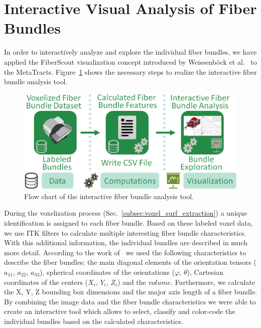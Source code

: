 \section{Interactive Visual Analysis of Fiber Bundles}
\label{subsec:interactive_tool_gui}
In order to interactively analyze and explore the individual fiber bundles, we have applied the FiberScout visualization concept introduced by Weissenb{\"o}ck et al.~\cite{Weissenbock2014} to the MetaTracts. Figure~\ref{fig:metatracts_fiberscout_workflow} shows the necessary steps to realize the interactive fiber bundle analysis tool.
\begin{figure}[htb]
	\centering
	\includegraphics[width=0.95\linewidth]{images/MetaTractsToFiberScout_workflow.eps}
	\caption{Flow chart of the interactive fiber bundle analysis tool.}
	\label{fig:metatracts_fiberscout_workflow}
\end{figure}
During the voxelization process (Sec.~\ref{subsec:voxel_surf_extraction}) a unique identification is assigned to each fiber bundle. Based on these labeled voxel data, we use ITK\cite{Ibanez2005} filters to calculate multiple interesting fiber bundle characteristics. With this additional information, the individual bundles are described in much more detail. According to the work of~\cite{Weissenbock2014} we used the following characteristics to describe the fiber bundles: the main diagonal elements of the orientation tensors ($a_{11}$, $a_{22}$, $a_{33}$), spherical coordinates of the orientations ($\varphi$, $\theta$), Cartesian coordinates of the centers ($X_{i}$, $Y_{i}$, $Z_{i}$) and the $volume$. Furthermore, we calculate the X, Y, Z bounding box dimensions and the major axis length of a fiber bundle. By combining the image data and the fiber bundle characteristics we were able to create an interactive tool which allows to select, classify and color-code the individual bundles based on the calculated characteristics.


